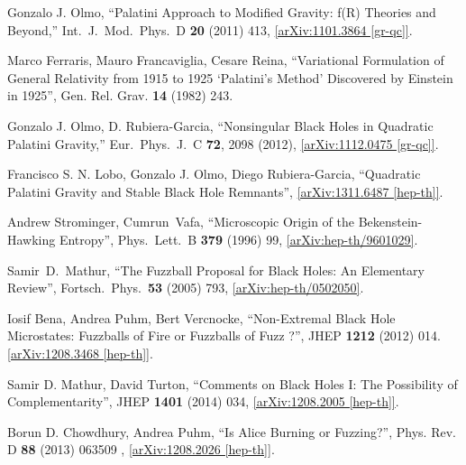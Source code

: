 \documentclass[12pt]{article}
\newcommand{\2}{$^2$}
\newcommand{\3}{$^3$}
\newcommand{\4}{$_4$}
\newcommand{\5}{$_5$}
\begin{document}
\begin{thebibliography}{400}
  Gonzalo J. Olmo,
  ``Palatini Approach to Modified Gravity: f(R) Theories and Beyond,''
  Int.\ J.\ Mod.\ Phys.\ D {\bf 20} (2011) 413, \href{http://arxiv.org/abs/1101.3864}
  {[arXiv:1101.3864 [gr-qc]]}.
	
Marco Ferraris, Mauro Francaviglia, Cesare Reina, ``Variational Formulation of General Relativity from 1915 to 1925 `Palatini's Method' Discovered by Einstein in 1925'', Gen. Rel. Grav. \textbf{14} (1982) 243.

Gonzalo J. Olmo, D. Rubiera-Garcia,
  ``Nonsingular Black Holes in Quadratic Palatini Gravity,''
  Eur.\ Phys.\ J.\ C {\bf 72}, 2098 (2012), \href{http://arxiv.org/abs/1112.0475}{
  [arXiv:1112.0475 [gr-qc]]}.
	

Francisco S. N. Lobo, Gonzalo J. Olmo, Diego Rubiera-Garcia, ``Quadratic Palatini Gravity and Stable Black Hole Remnants'',  \href{http://arxiv.org/abs/1311.6487}{[arXiv:1311.6487 [hep-th]]}.

  Andrew Strominger, Cumrun~Vafa,
  ``Microscopic Origin of the Bekenstein-Hawking Entropy'',
  Phys.\ Lett.\ B {\bf 379} (1996) 99, \href{http://arxiv.org/abs/hep-th/9601029}{
  [arXiv:hep-th/9601029]}.

  Samir~D.~Mathur,
  ``The Fuzzball Proposal for Black Holes: An Elementary Review'',
  Fortsch.\ Phys.\  {\bf 53} (2005) 793, \href{http://arxiv.org/abs/hep-th/0502050}{
  [arXiv:hep-th/0502050]}.


Iosif Bena, Andrea Puhm, Bert Vercnocke, ``Non-Extremal Black Hole Microstates: Fuzzballs of Fire or Fuzzballs of Fuzz ?'', JHEP \textbf{1212} (2012) 014. \href{http://arxiv.org/abs/1208.3468}{[arXiv:1208.3468 [hep-th]]}.

Samir D. Mathur, David Turton,  ``Comments on Black Holes I: The Possibility of Complementarity'', JHEP \textbf{1401} (2014) 034, 
  \href{http://arxiv.org/abs/1208.2005}{[arXiv:1208.2005 [hep-th]]}.
	
  Borun D. Chowdhury, Andrea Puhm,
  ``Is Alice Burning or Fuzzing?'',  Phys. Rev. D \textbf{88} (2013) 063509 , \href{http://arxiv.org/abs/1208.2026}{
  [arXiv:1208.2026 [hep-th]]}.
	

\end{thebibliography}
\end{document}
